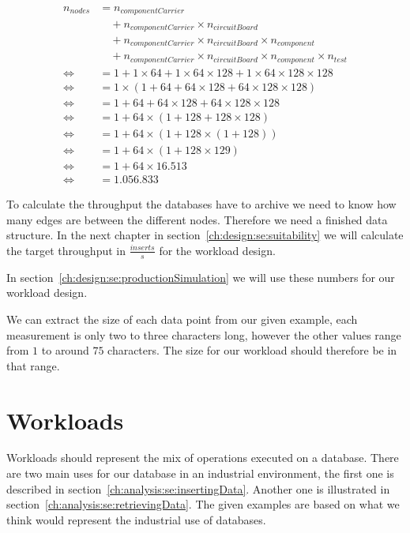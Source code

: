 \begin{equation}
  \label{eq:dataAmount}
  \begin{aligned}
    n_{nodes} &= n_{componentCarrier} \\
    &\quad + n_{componentCarrier} \times n_{circuitBoard} \\
    &\quad + n_{componentCarrier} \times n_{circuitBoard} \times n_{component} \\
    &\quad + n_{componentCarrier} \times n_{circuitBoard} \times n_{component} \times n_{test} \\
    \iff &= 1 + 1 \times 64 + 1 \times 64 \times 128 + 1 \times 64 \times 128 \times 128 \\
    \iff &= 1 \times (1 + 64 + 64 \times 128 + 64 \times 128 \times 128) \\
    \iff &= 1 + 64 + 64 \times 128 + 64 \times 128 \times 128 \\
    \iff &= 1 + 64 \times (1 + 128 + 128 \times 128) \\
    \iff &= 1 + 64 \times (1 + 128 \times (1 + 128)) \\
    \iff &= 1 + 64 \times (1 + 128 \times 129) \\
    \iff &= 1 + 64 \times 16.513 \\
    \iff &= 1.056.833
  \end{aligned}
\end{equation}

To calculate the throughput the databases have to archive we need to know how many edges are between the different nodes.
Therefore we need a finished data structure.
In the next chapter in section~\ref{ch:design:se:suitability} we will calculate the target throughput in $ \frac{inserts}{s} $ for the workload design.

In section~\ref{ch:design:se:productionSimulation} we will use these numbers for our workload design.

We can extract the size of each data point from our given example,
each measurement is only two to three characters long,
however the other values range from $ 1 $ to around $ 75 $ characters.
The size for our workload should therefore be in that range.

\section{Workloads}
\label{ch:analysis:se:workloads}
Workloads should represent the mix of operations executed on a database.
There are two main uses for our database in an industrial environment,
the first one is described in section~\ref{ch:analysis:se:insertingData}.
Another one is illustrated in section~\ref{ch:analysis:se:retrievingData}.
The given examples are based on what we think would represent the industrial use of databases.

